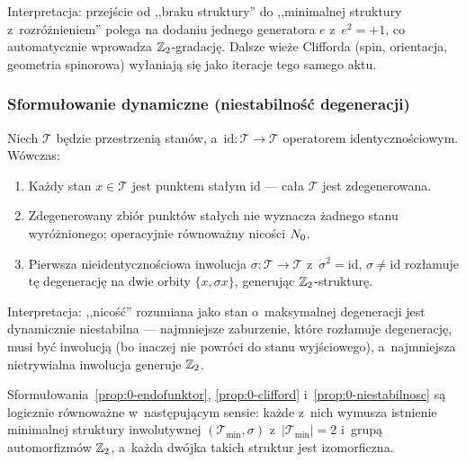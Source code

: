 Interpretacja: przej\'scie od ,,braku struktury'' do ,,minimalnej
struktury z~rozr\'o\.znieniem'' polega na dodaniu jednego generatora
$e$ z~$e^2 = +1$, co automatycznie wprowadza $\mathbb{Z}_2$-gradacj\k{e}.
Dalsze wie\.ze Clifforda (spin, orientacja, geometria spinorowa)
wy\l{}aniaj\k{a} si\k{e} jako iteracje tego samego aktu.

\subsubsection{Sformu\l{}owanie dynamiczne (niestabilność degeneracji)}%
\label{app:0-dynamiczne}

\begin{proposition}%
\label{prop:0-niestabilnosc}
Niech $\mathcal{T}$ b\k{e}dzie przestrzeni\k{a} stan\'ow, a~$\mathrm{id}:
\mathcal{T} \to \mathcal{T}$ operatorem identyczno\'sciowym. W\'owczas:
\begin{enumerate}[label=(\roman*), nosep]
  \item Ka\.zdy stan $x \in \mathcal{T}$ jest punktem sta\l{}ym
    $\mathrm{id}$ --- ca\l{}a $\mathcal{T}$ jest zdegenerowana.
  \item Zdegenerowany zbi\'or punkt\'ow sta\l{}ych nie wyznacza
    \.zadnego stanu wyr\'o\.znionego; operacyjnie r\'ownowa\.zny
    nicości $N_0$.
  \item Pierwsza nieidentyczno\'sciowa inwolucja $\sigma: \mathcal{T}
    \to \mathcal{T}$ z~$\sigma^2 = \mathrm{id}$, $\sigma \neq \mathrm{id}$
    roz\l{}amuje t\k{e} degeneracj\k{e} na dwie orbity $\{x, \sigma x\}$,
    generuj\k{a}c $\mathbb{Z}_2$-strukturę.
\end{enumerate}
\end{proposition}

Interpretacja: ,,nicość'' rozumiana jako stan o~maksymalnej
degeneracji jest dynamicznie niestabilna --- najmniejsze zaburzenie,
kt\'ore roz\l{}amuje degeneracj\k{e}, musi by\'c inwolucj\k{a}
(bo inaczej nie powr\'oci do stanu wyj\'sciowego), a~najmniejsza
nietrywialna inwolucja generuje $\mathbb{Z}_2$.

\begin{theorem}%
\label{thm:0-rownowaznosc}
Sformu\l{}owania~\ref{prop:0-endofunktor},
\ref{prop:0-clifford} i~\ref{prop:0-niestabilnosc} s\k{a}
logicznie r\'ownowa\.zne w~nast\k{e}puj\k{a}cym sensie: ka\.zde z~nich
wymusza istnienie minimalnej struktury inwolutywnej
$(\mathcal{T}_{\min}, \sigma)$ z~$|\mathcal{T}_{\min}| = 2$ i~grup\k{a}
automorfizm\'ow $\mathbb{Z}_2$, a~ka\.zda dw\'ojka takich struktur jest
izomorficzna.
\end{theorem}

